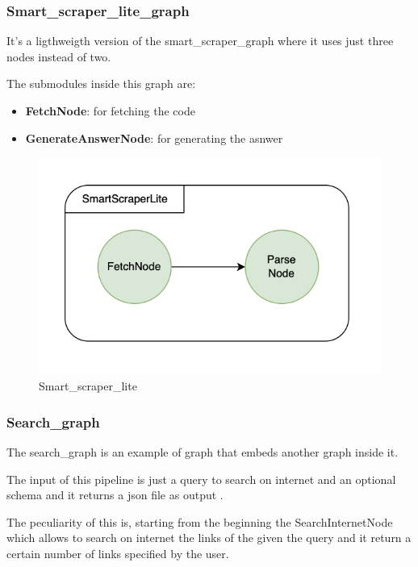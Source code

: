 \subsubsection{Smart\_scraper\_lite\_graph}
It's a ligthweigth version of the smart\_scraper\_graph where it uses just three nodes instead of two.

The submodules inside this graph are:

\begin{itemize}
    \item \textbf{FetchNode}: for fetching the code
    \item \textbf{GenerateAnswerNode}: for generating the asnwer
\end{itemize}

\begin{figure}[H]
    \centering
    \includegraphics[width=0.5\linewidth]{Assets/smart_scraper_lite.png}
    \caption{Smart\_scraper\_lite}
    \label{fig:enter-label}
\end{figure}
\subsubsection{Search\_graph}
The search\_graph is an example of graph that embeds another graph inside it.

The input of this pipeline is just a query to search on internet and an optional schema and it returns a json file as output .

The peculiarity of this is, starting from the beginning the SearchInternetNode which allows to search on internet the links of the given the query and it return a certain number of links specified by the user.

